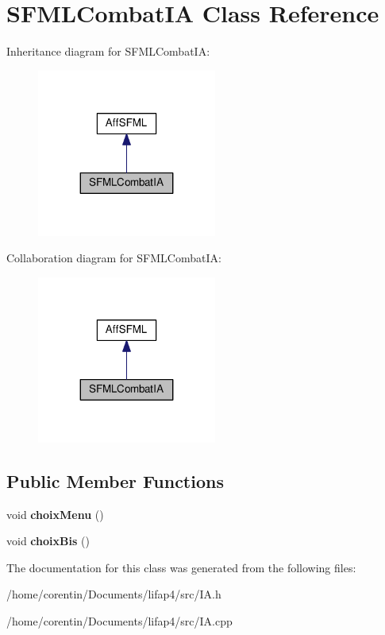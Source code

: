 \hypertarget{class_s_f_m_l_combat_i_a}{}\section{S\+F\+M\+L\+Combat\+IA Class Reference}
\label{class_s_f_m_l_combat_i_a}


Inheritance diagram for S\+F\+M\+L\+Combat\+IA\+:
\nopagebreak
\begin{figure}[H]
\begin{center}
\leavevmode
\includegraphics[width=167pt]{class_s_f_m_l_combat_i_a__inherit__graph}
\end{center}
\end{figure}


Collaboration diagram for S\+F\+M\+L\+Combat\+IA\+:
\nopagebreak
\begin{figure}[H]
\begin{center}
\leavevmode
\includegraphics[width=167pt]{class_s_f_m_l_combat_i_a__coll__graph}
\end{center}
\end{figure}
\subsection*{Public Member Functions}
\begin{DoxyCompactItemize}
\item 
\mbox{\label{class_s_f_m_l_combat_i_a_a2e93206e7bf49b3ba66c24447af70b72}} 
void {\bfseries choix\+Menu} ()
\item 
\mbox{\label{class_s_f_m_l_combat_i_a_a67a258bf9168e944933280bda649df6a}} 
void {\bfseries choix\+Bis} ()
\end{DoxyCompactItemize}


The documentation for this class was generated from the following files\+:\begin{DoxyCompactItemize}
\item 
/home/corentin/\+Documents/lifap4/src/I\+A.\+h\item 
/home/corentin/\+Documents/lifap4/src/I\+A.\+cpp\end{DoxyCompactItemize}
